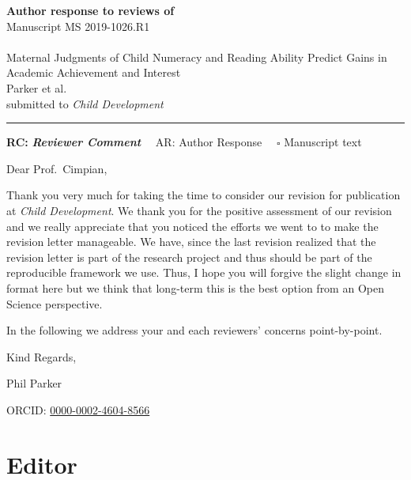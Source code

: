 \documentclass[]{article}
\begin{document}
{\Large\bf Author response to reviews of}\\[1em]
Manuscript MS 2019-1026.R1\\ \\
{\Large Maternal Judgments of Child Numeracy and Reading Ability Predict Gains in Academic Achievement and Interest}\\[1em]
{Parker et al.}\\
{submitted to \it Child Development }\\
\hrule

\hfill {\bfseries RC:} \textbf{\textit{Reviewer Comment}}\(\quad\) AR: Author Response \(\quad\square\) Manuscript text

\vspace{2em}

Dear Prof.~Cimpian,


Thank you very much for taking the time to consider our revision for publication at \emph{Child Development}. We thank you for the positive assessment of our revision and we really appreciate that you noticed the efforts we went to to make the revision letter manageable. We have, since the last revision realized that the revision letter is part of the research project and thus should be part of the reproducible framework we use. Thus, I hope you will forgive the slight change in format here but we think that long-term this is the best option from an Open Science perspective.

In the following we address your and each reviewers' concerns point-by-point.

Kind Regards,

Phil Parker

ORCID: \href{https://orcid.org/0000-0002-4604-8566}{0000-0002-4604-8566}

\clearpage

\tableofcontents

\clearpage

\hypertarget{editor}{%
\section{Editor}\label{editor}}


\end{document}
